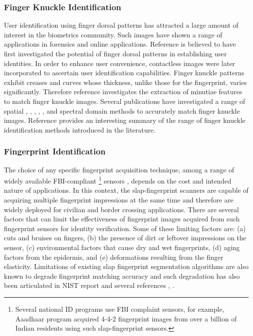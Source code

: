 \subsubsection{Finger Knuckle Identification\label{relate-work-fk}} 
User identification using finger dorsal patterns has attracted a large amount of interest in the biometrics community. Such images have shown a range of applications in forensics and online applications. Reference \cite{joshi1998computer} is believed to have first investigated the potential of finger dorsal patterns in establishing user identities. In order to enhance user convenience, contactless images were later incorporated to ascertain user identification capabilities. Finger knuckle patterns exhibit creases and curves whose thickness, unlike those for the fingerprint, varies significantly. Therefore reference \cite{kumar2015recovering} investigates the extraction of minutiae features to match finger knuckle images. Several publications have investigated a range of spatial \cite{woodard2005finger}, \cite{sricharan2006knuckle}, \cite{kumar2009personal}, \cite{zhang2010online}, \cite{zhu2010multimodal}, and spectral domain \cite{aoyama2011finger} methods to accurately match finger knuckle images. Reference \cite{jaswal2016knuckle} provides an interesting summary of the range of finger knuckle identification methods introduced in the literature. 

\textcolor{red}{}


\subsubsection{Fingerprint Identification\label{realate-work-fp}}
The choice of any specific fingerprint acquisition technique, among a range of widely available FBI-compliant \footnote[1]{Several national ID programs use FBI complaint sensors, for example, Aaadhaar program acquired 4-4-2 fingerprint images from over a billion of Indian residents using such \cite{fbi-sensor} slap-fingerprint sensors.} sensors \cite{fbi-sensor}, depends on the cost and intended nature of applications. In this context, the slap-fingerprint scanners are capable of acquiring multiple fingerprint impressions at the same time and therefore are widely deployed for civilian and border crossing applications. There are several factors that can limit the effectiveness of ﬁngerprint images acquired from such fingerprint sensors for identity verification. Some of these limiting factors are: (a) cuts and bruises on ﬁngers, (b) the presence of dirt or leftover impressions on the sensor, (c) environmental factors that cause dry and wet fingerprints, (d) aging factors from the epidermis, and (e) deformations resulting from the finger elasticity. Limitations of existing slap fingerprint segmentation algorithms are also known to degrade fingerprint matching accuracy and such degradation has also been articulated in NIST report \cite{watson2009slapssegii} and several references \cite{maltoni2009handbook}, \cite{zhang2010slap}.

